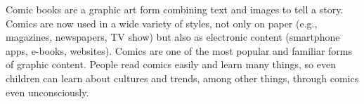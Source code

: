 



Comic books are a graphic art form combining text and images to tell a story.
Comics are now used in a wide variety of styles, not only on paper (e.g., magazines, newspapers, TV show) but also as electronic content (smartphone apps, e-books, websites).
Comics are one of the most popular and familiar forms of graphic content.
People read comics easily and learn many things, so even children can learn about cultures and trends, among other things, through comics even unconsciously.

